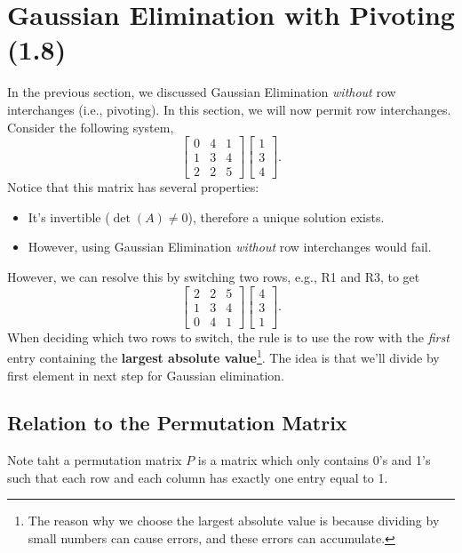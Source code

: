 \documentclass[letterpaper]{article}
\newcommand{\0}{\mathbf{0}}
\begin{document}
\section{Gaussian Elimination with Pivoting (1.8)}
In the previous section, we discussed Gaussian Elimination \emph{without} row interchanges (i.e., pivoting). In this section, we will now permit row interchanges. Consider the following system, 
\[\begin{bmatrix}
    0 & 4 & 1 \\ 
    1 & 3 & 4 \\ 
    2 & 2 & 5
\end{bmatrix} \begin{bmatrix}
    1 \\ 3 \\ 4
\end{bmatrix}.\]
Notice that this matrix has several properties: 
\begin{itemize}
    \item It's invertible ($\det(A) \neq 0$), therefore a unique solution exists. 
    \item However, using Gaussian Elimination \emph{without} row interchanges would fail. 
\end{itemize}
However, we can resolve this by switching two rows, e.g., R1 and R3, to get 
\[\begin{bmatrix}
    2 & 2 & 5 \\ 
    1 & 3 & 4 \\ 
    0 & 4 & 1
\end{bmatrix} \begin{bmatrix}
    4 \\ 3 \\ 1
\end{bmatrix}.\]
When deciding which two rows to switch, the rule is to use the row with the \emph{first} entry containing the \textbf{largest absolute value}\footnote{The reason why we choose the largest absolute value is because dividing by small numbers can cause errors, and these errors can accumulate.}. The idea is that we'll divide by first element in next step for Gaussian elimination.

\subsection{Relation to the Permutation Matrix}
Note taht a permutation matrix $P$ is a matrix which only contains 0's and 1's such that each row and each column has exactly one entry equal to 1. 
\end{document}
